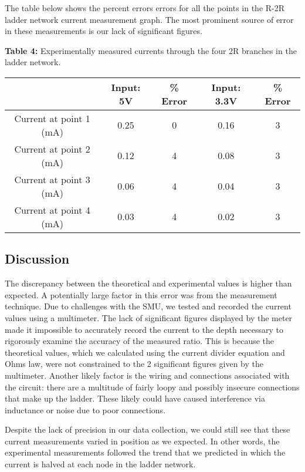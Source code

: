 \documentclass{article}
\begin{document}
The table below shows the percent errors errors for all the points in the R-2R ladder network current measurement graph. The most prominent source of error in these measurements is our lack of significant figures.

\begin{center}
\textbf{Table 4:} Experimentally measured currents through the four 2R branches in the ladder network.
\small\addtolength{\tabcolsep}{-5pt}
    \begin{tabular}{|c|c|c|c|c|} \hline
          & Input: 5V & \% Error & Input: 3.3V & \% Error \\ \hline
        Current at point 1 (mA) & 0.25 & 0 & 0.16 & 3\\ \hline
        Current at point 2 (mA) & 0.12 & 4 & 0.08 & 3 \\ \hline
        Current at point 3 (mA) & 0.06 & 4  & 0.04 & 3 \\ \hline
        Current at point 4 (mA) & 0.03 & 4  & 0.02 & 3\\ \hline
    \end{tabular}
\end{center}

\subsection{Discussion}

The discrepancy between the theoretical and experimental values is higher than expected.  A potentially large factor in this error was from the measurement technique.  Due to challenges with the SMU, we tested and recorded the current values using a multimeter. The lack of significant figures displayed by the meter made it impossible to accurately record the current to the depth necessary to rigorously examine the accuracy of the measured ratio. This is because the theoretical values, which we calculated using the current divider equation and Ohms law, were not constrained to the 2 significant figures given by the multimeter. Another likely factor is the wiring and connections associated with the circuit: there are a multitude of fairly loopy and possibly insecure connections that make up the ladder. These likely could have caused interference via inductance or noise due to poor connections.

Despite the lack of precision in our data collection, we could still see that these current measurements varied in position as we expected. In other words, the experimental measurements followed the trend that we predicted in which the current is halved at each node in the ladder network.
\end{document}
